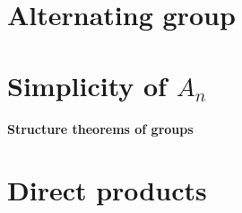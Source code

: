 \documentclass[twocolumn]{article}
\begin{document}
\section{Alternating group}
\setcounter{defi}{0}
\setcounter{teo}{0}
\setcounter{coro}{0}


\section{Simplicity of $A_n$}
\setcounter{defi}{0}
\setcounter{teo}{0}
\setcounter{coro}{0}


\textbf{\huge Structure theorems of groups}
\section{Direct products}
\setcounter{defi}{0}
\setcounter{teo}{0}
\setcounter{coro}{0}

\end{document}
